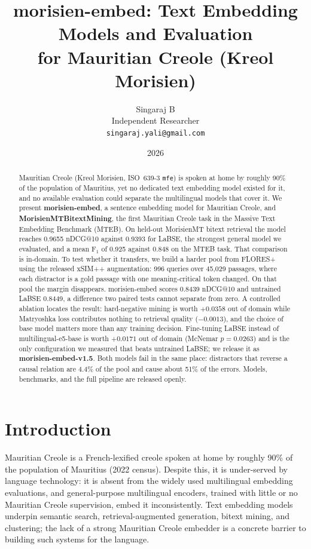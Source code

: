 \documentclass[11pt]{article}
\title{\textbf{morisien-embed: Text Embedding Models and Evaluation\\for Mauritian Creole (Kreol Morisien)}}
\author{Singaraj B\\
\normalsize Independent Researcher\\
\normalsize \texttt{singaraj.yali@gmail.com}}
\date{2026}
\begin{document}
\maketitle

\begin{abstract}
Mauritian Creole (Kreol Morisien, ISO~639-3 \texttt{mfe}) is spoken at home by roughly 90\% of the
population of Mauritius, yet no dedicated text embedding model existed for it, and no available
evaluation could separate the multilingual models that cover it. We present \textbf{morisien-embed},
a sentence embedding model for Mauritian Creole, and \textbf{MorisienMTBitextMining}, the first
Mauritian Creole task in the Massive Text Embedding Benchmark (MTEB). On held-out MorisienMT bitext
retrieval the model reaches 0.9655 nDCG@10 against 0.9393 for LaBSE, the strongest general model we
evaluated, and a mean F$_1$ of 0.925 against 0.848 on the MTEB task. That comparison is in-domain.
To test whether it transfers, we build a harder pool from FLORES+ using the released xSIM++
augmentation: 996 queries over 45{,}029 passages, where each distractor is a gold passage with one
meaning-critical token changed. On that pool the margin disappears. morisien-embed scores 0.8439
nDCG@10 and untrained LaBSE 0.8449, a difference two paired tests cannot separate from zero. A
controlled ablation locates the result: hard-negative mining is worth $+0.0358$ out of domain while
Matryoshka loss contributes nothing to retrieval quality ($-0.0013$), and the choice of base model
matters more than any training decision. Fine-tuning LaBSE instead of multilingual-e5-base is worth
$+0.0171$ out of domain (McNemar $p = 0.0263$) and is the only configuration we measured that beats
untrained LaBSE; we release it as \textbf{morisien-embed-v1.5}. Both models fail in the same place:
distractors that reverse a causal relation are 4.4\% of the pool and cause about 51\% of the errors.
Models, benchmarks, and the full pipeline are released openly.
\end{abstract}

\section{Introduction}

Mauritian Creole is a French-lexified creole spoken at home by roughly 90\% of the population of
Mauritius (2022 census). Despite this, it is under-served by language technology: it is absent from
the widely used multilingual embedding evaluations, and general-purpose multilingual encoders,
trained with little or no Mauritian Creole supervision, embed it inconsistently. Text embedding
models underpin semantic search, retrieval-augmented generation, bitext mining, and clustering; the
lack of a strong Mauritian Creole embedder is a concrete barrier to building such systems for the
language.
\end{document}
